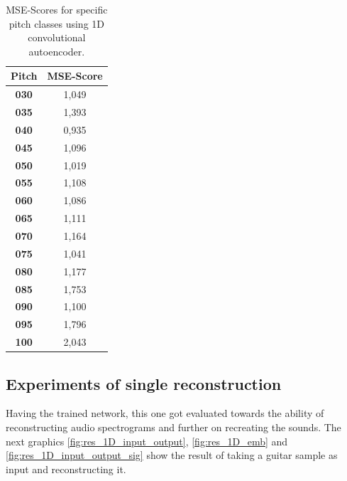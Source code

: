 \begin{table}[htb!]
    \centering
    \begin{tabular}{|c|c|}
        \hline
         \textbf{Pitch} & \textbf{MSE-Score} \\
         \hline
         \textbf{030} & 1,049\\
         \hline
         \textbf{035} & 1,393\\
         \hline
         \textbf{040} & 0,935\\
         \hline
         \textbf{045} & 1,096\\
         \hline
         \textbf{050} & 1,019\\
         \hline
         \textbf{055} & 1,108\\
         \hline
         \textbf{060} & 1,086\\
         \hline
         \textbf{065} & 1,111\\
         \hline
         \textbf{070} & 1,164\\
         \hline
         \textbf{075} & 1,041\\
         \hline
         \textbf{080} & 1,177\\
         \hline
         \textbf{085} & 1,753\\
         \hline
         \textbf{090} & 1,100\\
         \hline
         \textbf{095} & 1,796\\
         \hline
         \textbf{100} & 2,043\\
         \hline
    \end{tabular}
    \caption{MSE-Scores for specific pitch classes using 1D convolutional autoencoder.}
    \label{tab:res_scores_1D_pitch}
\end{table}

\subsection{Experiments of single reconstruction}
Having the trained network, this one got evaluated towards the ability of reconstructing audio spectrograms and further on recreating the sounds. The next graphics \ref{fig:res_1D_input_output}, \ref{fig:res_1D_emb} and \ref{fig:res_1D_input_output_sig} show the result of taking a guitar sample as input and reconstructing it. 

